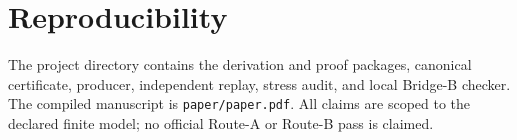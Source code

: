 \documentclass[10pt]{article}
\begin{document}
\section{Reproducibility}

The project directory contains the derivation and proof packages, canonical
certificate, producer, independent replay, stress audit, and local Bridge-B
checker.  The compiled manuscript is \texttt{paper/paper.pdf}.  All claims
are scoped to the declared finite model; no official Route-A or Route-B pass
is claimed.



\end{document}
